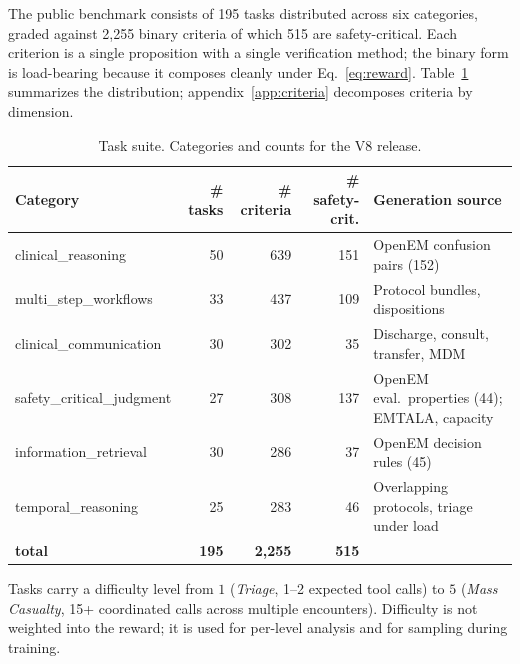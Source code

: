 The public benchmark consists of
195 tasks  %
distributed across six categories,  %
graded against
2{,}255 binary criteria  %
of which
515 are safety-critical.  %
Each criterion is a single proposition with a single verification
method; the binary form is load-bearing because it composes cleanly
under Eq.~\ref{eq:reward}. Table~\ref{tab:tasks} summarizes the
distribution; appendix~\ref{app:criteria} decomposes criteria by
dimension.

\begin{table}[t]
\centering
\caption{Task suite. Categories and counts for the V8 release.}
\label{tab:tasks}
\small
\setlength{\tabcolsep}{4pt}
\begin{tabular}{@{}lrrrp{4.4cm}@{}}
\toprule
Category & \# tasks & \# criteria & \# safety-crit. & Generation source \\
\midrule
clinical\_reasoning        & 50 & 639 & 151 & OpenEM confusion pairs (152) \\
multi\_step\_workflows     & 33 & 437 & 109 & Protocol bundles, dispositions \\
clinical\_communication    & 30 & 302 & 35  & Discharge, consult, transfer, MDM \\
safety\_critical\_judgment & 27 & 308 & 137 & OpenEM eval.\ properties (44); \mbox{EMTALA}, capacity \\
information\_retrieval     & 30 & 286 & 37  & OpenEM decision rules (45) \\
temporal\_reasoning        & 25 & 283 & 46  & Overlapping protocols, triage under load \\
\midrule
\textbf{total} & \textbf{195} & \textbf{2{,}255} & \textbf{515} & \\
\bottomrule
\end{tabular}
\end{table}

Tasks carry a difficulty level from $1$ (\emph{Triage}, 1--2 expected
tool calls) to $5$ (\emph{Mass Casualty}, 15+ coordinated calls across
multiple encounters). Difficulty is not weighted into the reward; it
is used for per-level analysis and for sampling during training.

